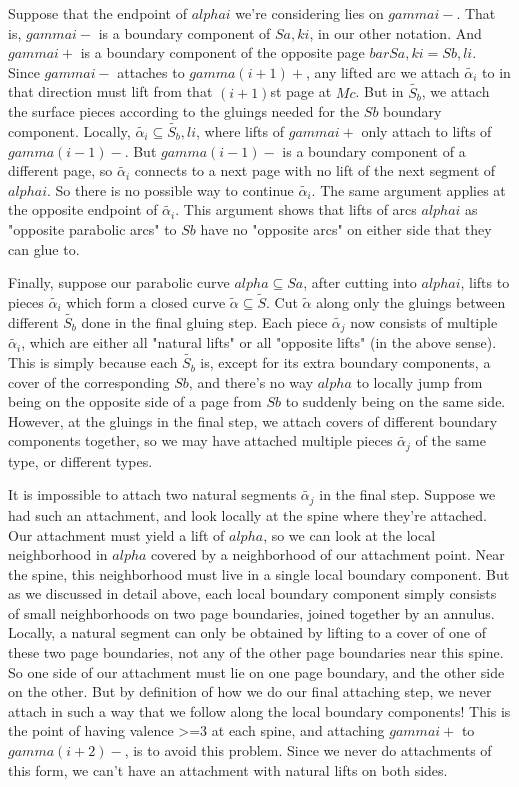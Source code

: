 \documentclass[12pt]{amsart}
\theoremstyle{definition}
\theoremstyle{remark}
\newcommand{\cin}{\subseteq}
\begin{document}
Suppose that the endpoint of $alphai$ we're considering lies on $gammai-$. That
is, $gammai-$ is a boundary component of $Sa,ki$, in our other notation. And
$gammai+$ is a boundary component of the opposite page $barSa,ki = Sb,li$.
Since $gammai-$ attaches to $gamma(i+1)+$, any lifted arc we attach
$\widetilde{\alpha_i}$ to in that direction must lift from that $(i+1)$st page at $Mc$.
But in $\widetilde{S_b}$, we attach the surface pieces according to the gluings needed
for the $Sb$ boundary component.  Locally, $\widetilde{\alpha_i} \cin \widetilde{S_b},li$, where
lifts of $gammai+$ only attach to lifts of $gamma(i-1)-$. But $gamma(i-1)-$ is
a boundary component of a different page, so $\widetilde{\alpha_i}$ connects to a next
page with no lift of the next segment of $alphai$. So there is no possible way
to continue $\widetilde{\alpha_i}$.  The same argument applies at the opposite endpoint
of $\widetilde{\alpha_i}$. This argument shows that lifts of arcs $alphai$ as "opposite
parabolic arcs" to $Sb$ have no "opposite arcs" on either side that they can
glue to.

Finally, suppose our parabolic curve $alpha \cin Sa$, after cutting into
$alphai$, lifts to pieces $\widetilde{\alpha_i}$ which form a closed curve $\widetilde{\alpha}
\cin \widetilde{S}$.  Cut $\widetilde{\alpha}$ along only the gluings between different
$\widetilde{S_b}$ done in the final gluing step. Each piece $\widetilde{\alpha_j}$ now consists
of multiple $\widetilde{\alpha_i}$, which are either all "natural lifts" or all
"opposite lifts" (in the above sense). This is simply because each $\widetilde{S_b}$
is, except for its extra boundary components, a cover of the corresponding
$Sb$, and there's no way $alpha$ to locally jump from being on the opposite
side of a page from $Sb$ to suddenly being on the same side. However, at the
gluings in the final step, we attach covers of different boundary components
together, so we may have attached multiple pieces $\widetilde{\alpha_j}$ of the same
type, or different types.

It is impossible to attach two natural segments $\widetilde{\alpha_j}$ in the final
step.  Suppose we had such an attachment, and look locally at the spine where
they're attached. Our attachment must yield a lift of $alpha$, so we can look
at the local neighborhood in $alpha$ covered by a neighborhood of our
attachment point.  Near the spine, this neighborhood must live in a single
local boundary component. But as we discussed in detail above, each local
boundary component simply consists of small neighborhoods on two page
boundaries, joined together by an annulus. Locally, a natural segment can only
be obtained by lifting to a cover of one of these two page boundaries, not any
of the other page boundaries near this spine. So one side of our attachment
must lie on one page boundary, and the other side on the other. But by
definition of how we do our final attaching step, we never attach in such a way
that we follow along the local boundary components! This is the point of having
valence >=3 at each spine, and attaching $gammai+$ to $gamma(i+2)-$, is to
avoid this problem. Since we never do attachments of this form, we can't have
an attachment with natural lifts on both sides.
\end{document}
